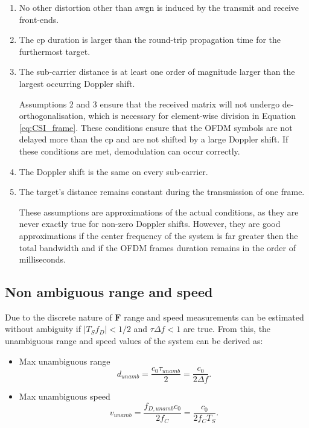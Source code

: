     \begin{enumerate}
    	\item No other distortion other than \gls{awgn} is induced by the transmit and receive front-ends.
    	\item The \gls{cp} duration is larger than the round-trip propagation time for the furthermost target.
    	\item The sub-carrier distance is at least one order of magnitude larger than the largest occurring Doppler shift.
    	
		Assumptions 2 and 3 ensure that the received matrix will not undergo de-orthogonalisation, which is necessary for element-wise division in Equation \eqref{eq:CSI_frame}. These conditions ensure that the OFDM symbols are not delayed more than the \gls{cp} and are not shifted by a large Doppler shift. If these conditions are met, demodulation can occur correctly.
    	
    	\item The Doppler shift is the same on every sub-carrier.
    	\item The target’s distance remains constant during the transmission of one frame.
    	
    	These assumptions are approximations of the actual conditions, as they are never exactly true for non-zero Doppler shifts. However, they are good approximations if the center frequency of the system is far greater then the total bandwidth and if the OFDM frames duration remains in the order of milliseconds.
    \end{enumerate}
    
    \subsection{Non ambiguous range and speed}
    
        Due to the discrete nature of $\mathbf{F}$ range and speed measurements can be estimated without ambiguity if $|T_S f_D| < 1/2$ and $\tau \Delta f < 1$ are true.
        From this, the unambiguous range and speed values of the system can be derived as:
        
        \begin{itemize}
            \item Max unambiguous range
            $$ d_{unamb} = \frac{c_0 \tau_{unamb}}{2} = \frac{c_0}{2\Delta f}.$$
            \item Max unambiguous speed
            $$ v_{unamb} = \frac{f_{D,unamb} c_0}{2f_C} = \frac{c_0}{2f_C T_S}.$$
        \end{itemize}
        
